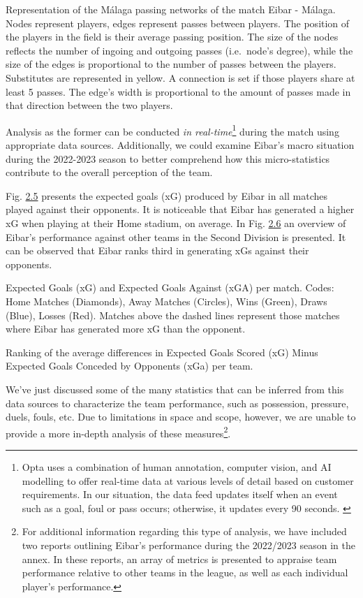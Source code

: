 \documentclass[twoside,nohyper]{tufte-book}
\begin{document}
Representation of the Málaga passing networks of the match
Eibar - Málaga. Nodes represent players, edges represent passes between
players. The position of the players in the field is their average
passing position. The size of the nodes reflects the number of ingoing
and outgoing passes (i.e.~node's degree), while the size of the edges is
proportional to the number of passes between the players. Substitutes
are represented in yellow. A connection is set if those players share at
least 5 passes. The edge's width is proportional to the amount of passes
made in that direction between the two players.

Analysis as the former can be conducted \emph{in real-time}\footnote{Opta uses a combination of human annotation, computer vision, and
  AI modelling to offer real-time data at various levels of detail
  based on customer requirements. In our situation, the data feed
  updates itself when an event such as a goal, foul or pass occurs;
  otherwise, it updates every 90 seconds. \citep{opta}} during the
match using appropriate data sources. Additionally, we could examine
Eibar's macro situation during the 2022-2023 season to better comprehend
how this micro-statistics contribute to the overall perception of the
team.

Fig. \protect\hyperlink{f2.5}{2.5} presents the
expected goals (xG) produced by Eibar in all matches played against
their opponents. It is noticeable that Eibar has generated a higher xG
when playing at their Home stadium, on average. In Fig.
\protect\hyperlink{f2.6}{2.6} an overview of
Eibar's performance against other teams in the Second Division is
presented. It can be observed that Eibar ranks third in generating xGs
against their opponents.

Expected Goals (xG) and Expected Goals Against (xGA) per
match. Codes: Home Matches (Diamonds), Away Matches (Circles), Wins
(Green), Draws (Blue), Losses (Red). Matches above the dashed lines
represent those matches where Eibar has generated more xG than the
opponent.

Ranking of the average differences in Expected Goals Scored
(xG) Minus Expected Goals Conceded by Opponents (xGa) per
team.

We've just discussed some of the many statistics that can be inferred
from this data sources to characterize the team performance, such as
possession, pressure, duels, fouls, etc. Due to limitations in space and
scope, however, we are unable to provide a more in-depth analysis of
these measures\footnote{For additional information regarding this type of analysis, we
  have included two reports outlining Eibar's performance during the
  2022/2023 season in the annex. In these reports, an array of metrics
  is presented to appraise team performance relative to other teams in
  the league, as well as each individual player's performance.}.
\end{document}
